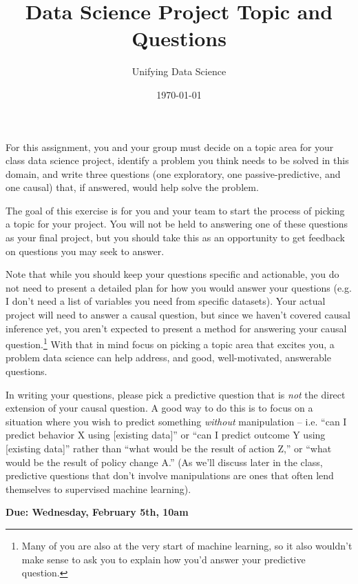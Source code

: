 \documentclass[12pt]{article}
\title{Data Science Project Topic and Questions}
\author{Unifying Data Science}
\date{\today}
\begin{document}
\maketitle

For this assignment, you and your group must decide on a topic area for your class data science project, identify a problem you think needs to be solved in this domain, and write three questions (one exploratory, one passive-predictive, and one causal) that, if answered, would help solve the problem.

The goal of this exercise is for you and your team to start the process of picking a topic for your project. You will not be held to answering one of these questions as your final project, but you should take this as an opportunity to get feedback on questions you may seek to answer.

Note that while you should keep your questions specific and actionable, you do not need to present a detailed plan for how you would answer your questions (e.g. I don't need a list of variables you need from specific datasets). Your actual project will need to answer a causal question, but since we haven't covered causal inference yet, you aren't expected to present a method for answering your causal question.\footnote{Many of you are also at the very start of machine learning, so it also wouldn't make sense to ask you to explain how you'd answer your predictive question.} With that in mind focus on picking a topic area that excites you, a problem data science can help address, and good, well-motivated, answerable questions.

In writing your questions, please pick a predictive question that is \emph{not} the direct extension of your causal question. A good way to do this is to focus on a situation where you wish to predict something \emph{without} manipulation -- i.e. ``can I predict behavior X using [existing data]'' or ``can I predict outcome Y using [existing data]'' rather than ``what would be the result of action Z,'' or ``what would be the result of policy change A.'' (As we'll discuss later in the class, predictive questions that don't involve manipulations are ones that often lend themselves to supervised machine learning).

\textbf{Due: Wednesday, February 5th, 10am}
\end{document}
